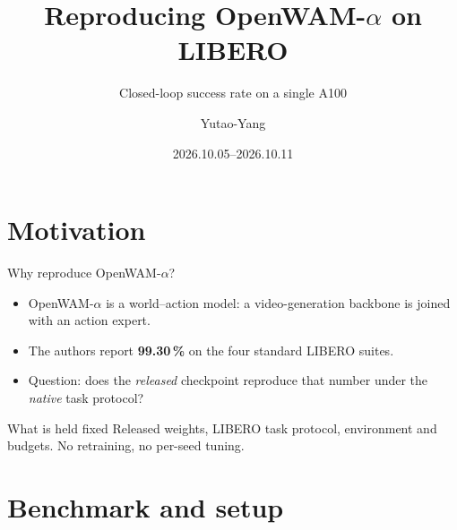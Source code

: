 

\title{Reproducing OpenWAM-\texorpdfstring{$\alpha$}{alpha} on LIBERO}
\subtitle{Closed-loop success rate on a single A100}
\author{Yutao-Yang}
\date{2026.10.05--2026.10.11}

\egotitleframe%
\egooutline%

\section{Motivation}

\begin{frame}{Why reproduce OpenWAM-\texorpdfstring{$\alpha$}{alpha}?}
  \begin{itemize}
    \item OpenWAM-\texorpdfstring{$\alpha$}{alpha} is a world--action model:
          a video-generation backbone is joined with an action expert.
    \item The authors report \textbf{99.30\,\%} on the four standard LIBERO
          suites.
    \item Question: does the \emph{released} checkpoint reproduce that number
          under the \emph{native} task protocol?
  \end{itemize}
  \vfill
  \begin{block}{What is held fixed}
    Released weights, LIBERO task protocol, environment and budgets.
    No retraining, no per-seed tuning.
  \end{block}
\end{frame}

\section{Benchmark and setup}

